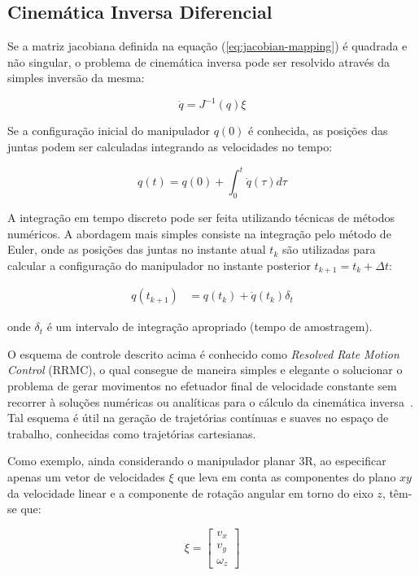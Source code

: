 \subsection{Cinemática Inversa Diferencial}

Se a matriz jacobiana definida na equação (\ref{eq:jacobian-mapping}) é
quadrada e não singular, o problema de cinemática inversa pode ser resolvido
através da simples inversão da mesma:

\begin{equation}\label{eq:resolved-rate}
    \dot{q} = J^{-1}(q) \xi
\end{equation}

Se a configuração inicial do manipulador \(q(0)\) é conhecida, as posições das
juntas podem ser calculadas integrando as velocidades no tempo:

\begin{equation}
    q(t) = q(0) + \int_{0}^{t} \dot{q}(\tau) d\tau
\end{equation}

A integração em tempo discreto pode ser feita utilizando técnicas de métodos
numéricos. A abordagem mais simples consiste na integração pelo método de
Euler, onde as posições das juntas no instante atual \(t_k\) são utilizadas
para calcular a configuração do manipulador no instante posterior \(t_{k+1} =
t_k + \Delta t\):

\begin{align}
    q(t_{k + 1}) & = q(t_k) + \dot{q}(t_k) \delta_t
\end{align}

onde \(\delta_t\) é um intervalo de integração apropriado (tempo de
amostragem).

O esquema de controle descrito acima é conhecido como \emph{
    Resolved Rate Motion Control} (RRMC), o qual consegue de 
maneira simples e elegante o solucionar o problema de gerar movimentos no efetuador 
final de velocidade constante sem recorrer à soluções numéricas ou analíticas para 
o cálculo da cinemática inversa~\cite{corke_robotics_2023}. 
Tal esquema é útil na geração de trajetórias contínuas e suaves no espaço de trabalho,
conhecidas como trajetórias cartesianas.

Como exemplo, ainda considerando o manipulador planar 3R, ao especificar apenas
um vetor de velocidades \(\xi\) que leva em conta as componentes do
plano \(xy\) da velocidade linear e a componente de rotação angular em torno do
eixo \(z\), têm-se que:

\begin{equation}
    \xi = \begin{bmatrix}
        v_x \\
        v_y \\
        \omega_z
    \end{bmatrix}
\end{equation}

